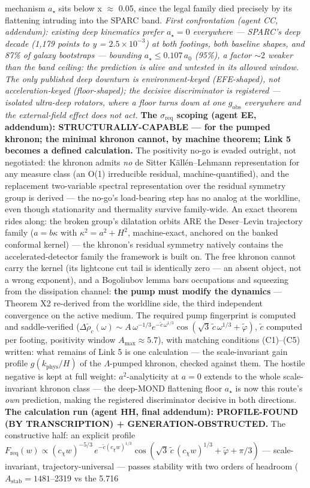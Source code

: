 \documentclass[11pt,a4paper]{article}
\begin{document}
mechanism $a_\star$ sits below x $\approx$ 0.05, since the legal family died precisely by its flattening intruding into the SPARC band. \emph{First confrontation (agent CC, addendum): existing deep kinematics prefer $a_\star = 0$ everywhere --- SPARC's deep decade (1,179 points to y = $2.5\times10^{-3}$) at both footings, both baseline shapes, and 87\% of galaxy bootstraps --- bounding $a_\star \le 0.107\,a_0$ (95\%), a factor ${\sim}2$ weaker than the band ceiling: the prediction is alive and untested in its allowed window. The only published deep downturn is environment-keyed (EFE-shaped), not acceleration-keyed (floor-shaped); the decisive discriminator is registered --- isolated ultra-deep rotators, where a floor turns down at one $g_{\mathrm{obs}}$ everywhere and the external-field effect does not act.} \textbf{The $\sigma_{\mathrm{req}}$ scoping (agent EE, addendum): STRUCTURALLY-CAPABLE --- for the pumped khronon; the minimal khronon cannot, by machine theorem; Link 5 becomes a defined calculation.} The positivity no-go is evaded outright, not negotiated: the khronon admits \emph{no} de Sitter K\"all\'en--Lehmann representation for any measure class (an O(1) irreducible residual, machine-quantified), and the replacement two-variable spectral representation over the residual symmetry group is derived --- the no-go's load-bearing step has no analog at the worldline, even though stationarity and thermality survive family-wide. An exact theorem rides along: the broken group's dilatation orbits ARE the Deser--Levin trajectory family ($a = b\kappa$ with $\kappa^2 = a^2 + H^2$, machine-exact, anchored on the banked conformal kernel) --- the khronon's residual symmetry natively contains the accelerated-detector family the framework is built on. The free khronon cannot carry the kernel (its lightcone cut tail is identically zero --- an absent object, not a wrong exponent), and a Bogoliubov lemma bars occupations and squeezing from the dissipation channel: \textbf{the pump must modify the dynamics} --- Theorem X2 re-derived from the worldline side, the third independent convergence on the active medium. The required pump fingerprint is computed and saddle-verified ($\Delta\tilde\rho_c(\omega) \sim A\,\omega^{-1/3} e^{-\tilde c\,\omega^{1/3}}\cos(\sqrt{3}\,\tilde c\,\omega^{1/3} + \tilde\varphi)$, $\tilde c$ computed per footing, positivity window $A_{\max} \approx 5.7$), with matching conditions (C1)--(C5) written: what remains of Link 5 is one calculation --- the scale-invariant gain profile $g(k_{\mathrm{phys}}/H)$ of the $\Lambda$-pumped khronon, checked against them. The hostile negative is kept at full weight: $a^2$-analyticity at $a = 0$ extends to the whole scale-invariant khronon class --- the deep-MOND flattening floor $a_\star$ is now this route's \emph{own} prediction, making the registered discriminator decisive in both directions. \textbf{The calculation run (agent HH, final addendum): PROFILE-FOUND (BY TRANSCRIPTION) + GENERATION-OBSTRUCTED.} The constructive half: an explicit profile $F_{\mathrm{req}}(w) \propto (c_\chi w)^{-5/3}\, e^{-\tilde c (c_\chi w)^{1/3}} \cos(\sqrt{3}\,\tilde c\,(c_\chi w)^{1/3}+\tilde\varphi+\pi/3)$ --- scale-invariant, trajectory-universal --- passes stability with two orders of headroom ($A_{\mathrm{stab}} = 1481$--2319 vs the 5.716 
\end{document}
